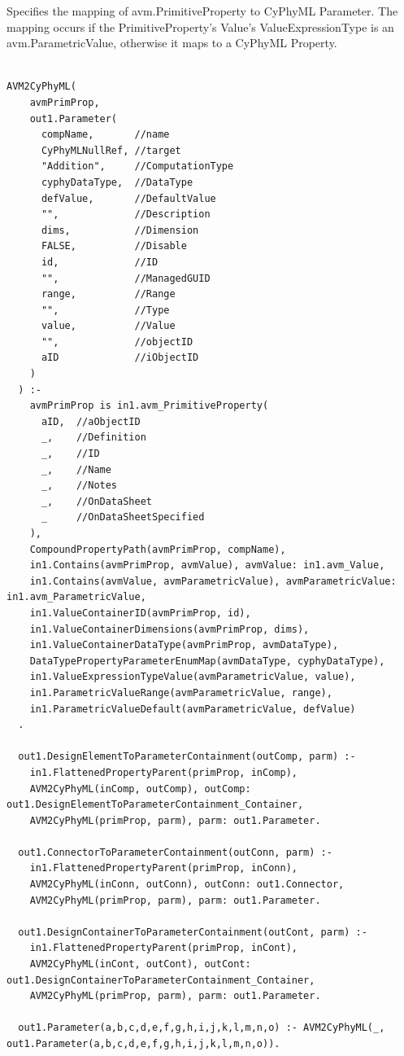 Specifies the mapping of avm.PrimitiveProperty to CyPhyML Parameter. The mapping occurs if the PrimitiveProperty's Value's ValueExpressionType is an avm.ParametricValue, otherwise it maps to a CyPhyML Property.
\begin{lstlisting}

AVM2CyPhyML(
    avmPrimProp,
    out1.Parameter(
      compName,       //name
      CyPhyMLNullRef, //target
      "Addition",     //ComputationType
      cyphyDataType,  //DataType
      defValue,       //DefaultValue
      "",             //Description
      dims,           //Dimension
      FALSE,          //Disable
      id,             //ID
      "",             //ManagedGUID
      range,          //Range
      "",             //Type
      value,          //Value
      "",             //objectID
      aID             //iObjectID
    )
  ) :-
    avmPrimProp is in1.avm_PrimitiveProperty(
      aID,  //aObjectID
      _,    //Definition
      _,    //ID
      _,    //Name
      _,    //Notes
      _,    //OnDataSheet
      _     //OnDataSheetSpecified
    ),
    CompoundPropertyPath(avmPrimProp, compName),
    in1.Contains(avmPrimProp, avmValue), avmValue: in1.avm_Value,
    in1.Contains(avmValue, avmParametricValue), avmParametricValue: in1.avm_ParametricValue,
    in1.ValueContainerID(avmPrimProp, id),
    in1.ValueContainerDimensions(avmPrimProp, dims),
    in1.ValueContainerDataType(avmPrimProp, avmDataType),
    DataTypePropertyParameterEnumMap(avmDataType, cyphyDataType),
    in1.ValueExpressionTypeValue(avmParametricValue, value),
    in1.ParametricValueRange(avmParametricValue, range),
    in1.ParametricValueDefault(avmParametricValue, defValue)
  .

  out1.DesignElementToParameterContainment(outComp, parm) :-
    in1.FlattenedPropertyParent(primProp, inComp),
    AVM2CyPhyML(inComp, outComp), outComp: out1.DesignElementToParameterContainment_Container,
    AVM2CyPhyML(primProp, parm), parm: out1.Parameter.

  out1.ConnectorToParameterContainment(outConn, parm) :-
    in1.FlattenedPropertyParent(primProp, inConn),
    AVM2CyPhyML(inConn, outConn), outConn: out1.Connector,
    AVM2CyPhyML(primProp, parm), parm: out1.Parameter.

  out1.DesignContainerToParameterContainment(outCont, parm) :-
    in1.FlattenedPropertyParent(primProp, inCont),
    AVM2CyPhyML(inCont, outCont), outCont: out1.DesignContainerToParameterContainment_Container,
    AVM2CyPhyML(primProp, parm), parm: out1.Parameter.

  out1.Parameter(a,b,c,d,e,f,g,h,i,j,k,l,m,n,o) :- AVM2CyPhyML(_, out1.Parameter(a,b,c,d,e,f,g,h,i,j,k,l,m,n,o)).


\end{lstlisting}

